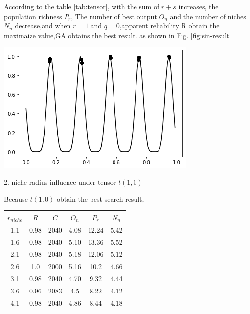 \documentclass[smallextended]{svjour3}       %
\begin{document}
\begin{multicols}{2}
According to the table \ref{tab:tensor}, with the sum of $r+s$ increases, the
population richness $P_r$, The number of best output $O_n$ and the number of
niches $N_n$ decrease,and when $r=1$ and $q=0$,apparent reliability R obtain the
maximaize value,GA obtains the best result.  as shown in Fig.
\ref{fig:sin-result} 

\begin{center}
  \includegraphics[width=\linewidth]{GA_images/example-sin-result.png}
  \label{fig:sin-result}
\end{center}

2. niche radius influence under tensor $t(1,0)$

Because $t(1,0)$ obtain the best search result,

\begin{center}
\begin{tabular}{cccccc}
	\toprule
    $r_{niche}$ & $R$ & $C$ & $O_{n}$ & $P_{r}$ & $N_{n}$\\
	\midrule
    1.1 & 0.98 & 2040 & 4.08 & 12.24 & 5.42 \\
    1.6 & 0.98 & 2040 & 5.10 & 13.36 & 5.52 \\
    2.1 & 0.98 & 2040 & 5.18 & 12.06 & 5.12 \\
    2.6 & 1.0  & 2000 & 5.16 & 10.2 & 4.66 \\
    3.1 & 0.98 & 2040 & 4.70 & 9.32 & 4.44 \\
    3.6 & 0.96 & 2083 & 4.5  & 8.22 & 4.12 \\
    4.1 & 0.98 & 2040 & 4.86 & 8.44 & 4.18 \\
	\bottomrule
\end{tabular}
\label{tab:d-share}
\end{center}


\end{multicols}
\end{document}
